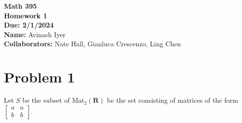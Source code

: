 \documentclass[10pt]{extarticle}
\title{}
\author{}
\date{}
\begin{document}
    \begin{center}
    {\bf \Large Math 395 \\[0.1in]Homework 1 \\[0.1in]
    Due: 2/1/2024}\\[.25in]
    {\bf Name:} {Avinash Iyer}\\[0.15in]
    {\bf Collaborators:} {Nate Hall, Gianluca Crescenzo, Ling Chen} \\
    \end{center}
  \section{Problem 1}%
  Let $S$ be the subset of $\text{Mat}_{2}(\mathbf{R})$ be the set consisting of matrices of the form $ \begin{bmatrix}a&a\\b&b\end{bmatrix} $.
\end{document}
